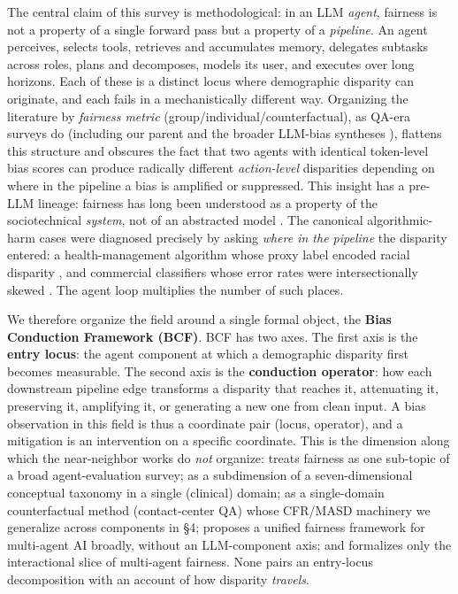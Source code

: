 \documentclass[10pt]{article}
\begin{document}
The central claim of this survey is methodological: in an LLM \emph{agent}, fairness is not a property of a single forward pass but a property of a \emph{pipeline}. An agent perceives, selects tools, retrieves and accumulates memory, delegates subtasks across roles, plans and decomposes, models its user, and executes over long horizons. Each of these is a distinct locus where demographic disparity can originate, and each fails in a mechanistically different way. Organizing the literature by \emph{fairness metric} (group/individual/counterfactual), as QA-era surveys do (including our parent \cite{chu2024fairness} and the broader LLM-bias syntheses \cite{gallegos2024bias,navigli2023biases}), flattens this structure and obscures the fact that two agents with identical token-level bias scores can produce radically different \emph{action-level} disparities depending on where in the pipeline a bias is amplified or suppressed. This insight has a pre-LLM lineage: fairness has long been understood as a property of the sociotechnical \emph{system}, not of an abstracted model \cite{selbst2019fairness}. The canonical algorithmic-harm cases were diagnosed precisely by asking \emph{where in the pipeline} the disparity entered: a health-management algorithm whose proxy label encoded racial disparity \cite{obermeyer2019dissecting}, and commercial classifiers whose error rates were intersectionally skewed \cite{buolamwini2018gender}. The agent loop multiplies the number of such places.

We therefore organize the field around a single formal object, the \textbf{Bias Conduction Framework (BCF)}. BCF has two axes. The first axis is the \textbf{entry locus}: the agent component at which a demographic disparity first becomes measurable. The second axis is the \textbf{conduction operator}: how each downstream pipeline edge transforms a disparity that reaches it, attenuating it, preserving it, amplifying it, or generating a new one from clean input. A bias observation in this field is thus a coordinate pair (locus, operator), and a mitigation is an intervention on a specific coordinate. This is the dimension along which the near-neighbor works do \emph{not} organize: \cite{mohammadi2025evaluation} treats fairness as one sub-topic of a broad agent-evaluation survey; \cite{vatsal2026agentic} as a subdimension of a seven-dimensional conceptual taxonomy in a single (clinical) domain; \cite{mayilvaghanan2026counterfactual} as a single-domain counterfactual method (contact-center QA) whose CFR/MASD machinery we generalize across components in \S{}4; \cite{ranjan2025fairness} proposes a unified fairness framework for multi-agent AI broadly, without an LLM-component axis; and \cite{binkyte2025interactional} formalizes only the interactional slice of multi-agent fairness. None pairs an entry-locus decomposition with an account of how disparity \emph{travels}.
\end{document}
